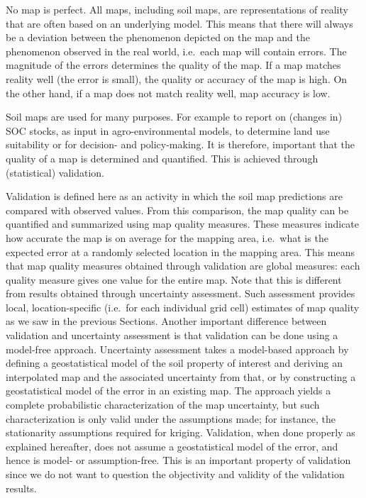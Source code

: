 \documentclass[10pt,b5paper,]{book}
\theoremstyle{definition}
\theoremstyle{definition}
\theoremstyle{definition}
\theoremstyle{remark}
\begin{document}
No map is perfect. All maps, including soil maps, are representations of
reality that are often based on an underlying model. This means that
there will always be a deviation between the phenomenon depicted on the
map and the phenomenon observed in the real world, i.e.~each map will
contain errors. The magnitude of the errors determines the quality of
the map. If a map matches reality well (the error is small), the quality
or accuracy of the map is high. On the other hand, if a map does not
match reality well, map accuracy is low.

Soil maps are used for many purposes. For example to report on (changes
in) SOC stocks, as input in agro-environmental models, to determine land
use suitability or for decision- and policy-making. It is therefore,
important that the quality of a map is determined and quantified. This
is achieved through (statistical) validation.

Validation is defined here as an activity in which the soil map
predictions are compared with observed values. From this comparison, the
map quality can be quantified and summarized using map quality measures.
These measures indicate how accurate the map is on average for the
mapping area, i.e.~what is the expected error at a randomly selected
location in the mapping area. This means that map quality measures
obtained through validation are global measures: each quality measure
gives one value for the entire map. Note that this is different from
results obtained through uncertainty assessment. Such assessment
provides local, location-specific (i.e.~for each individual grid cell)
estimates of map quality as we saw in the previous Sections. Another
important difference between validation and uncertainty assessment is
that validation can be done using a model-free approach. Uncertainty
assessment takes a model-based approach by defining a geostatistical
model of the soil property of interest and deriving an interpolated map
and the associated uncertainty from that, or by constructing a
geostatistical model of the error in an existing map. The approach
yields a complete probabilistic characterization of the map uncertainty,
but such characterization is only valid under the assumptions made; for
instance, the stationarity assumptions required for kriging. Validation,
when done properly as explained hereafter, does not assume a
geostatistical model of the error, and hence is model- or
assumption-free. This is an important property of validation since we do
not want to question the objectivity and validity of the validation
results.
\end{document}
